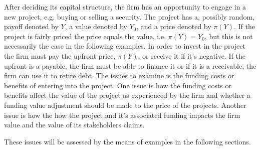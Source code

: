 \documentclass[main.tex]{subfiles}
\begin{document}
        After deciding its capital structure, the firm has an opportunity to engage in a new project, e.g. buying or selling a security.
        The project has a, possibly random, payoff denoted by $Y$, a value denoted by $Y_{0}$, and a price denoted by $\pi(Y)$.
        If the project is fairly priced the price equals the value, i.e. $\pi(Y) = Y_{0}$, but this is not necessarily the case in the following examples.
        In order to invest in the project the firm must pay the upfront price, $\pi(Y)$, or receive it if it's negative.
        If the upfront is a payable, the firm must be able to finance it or if it is a receivable, the firm can use it to retire debt.
        The issues to examine is the funding costs or benefits of entering into the project.
        One issue is how the funding costs or benefits affect the value of the project as experienced by the firm and whether a funding value adjustment should be made to the price of the projects.
        Another issue is how the how the project and it's associated funding impacts the firm value and the value of its stakeholders claims.

        These issues will be assessed by the means of examples in the following sections.
\end{document}
